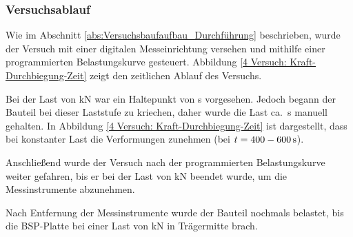 \subsubsection{Versuchsablauf}


Wie im Abschnitt \ref{abs:Versuchsbaufaufbau_Durchführung} beschrieben, wurde der Versuch mit einer digitalen Messeinrichtung versehen und mithilfe einer programmierten Belastungskurve gesteuert. Abbildung \ref{4 Versuch: Kraft-Durchbiegung-Zeit} zeigt den zeitlichen Ablauf des Versuchs. 

Bei der Last von \unit[5,4]{kN} war ein Haltepunkt von \unit[120]{s} vorgesehen. Jedoch begann der Bauteil bei dieser Laststufe zu kriechen, daher wurde die Last ca.\ \unit[900]{s} manuell gehalten. In Abbildung \ref{4 Versuch: Kraft-Durchbiegung-Zeit} ist dargestellt, dass bei konstanter Last die Verformungen zunehmen (bei $t=400 - \unit[600]{s}$).

Anschließend wurde der Versuch nach der programmierten Belastungskurve weiter gefahren, bis er bei der Last von \unit[7,5]{kN} beendet wurde, um die Messinstrumente abzunehmen.

Nach Entfernung der Messinstrumente wurde der Bauteil nochmals belastet, bis die BSP-Platte bei einer Last von \unit[12]{kN} in Trägermitte brach.

